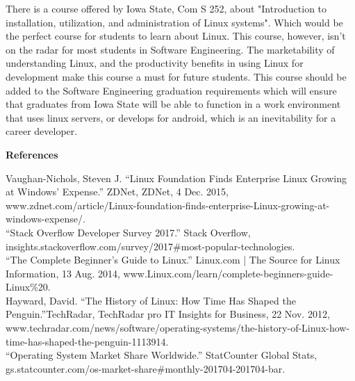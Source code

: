 \documentclass[11pt]{article}
\begin{document}
  \noindent There is a course offered by Iowa State, Com S 252, about "Introduction to installation, utilization, and administration of Linux systems". Which would be the perfect course
  for students to learn about Linux. This course, however, isn't on the radar for most students in Software Engineering. The marketability of understanding Linux, and the productivity benefits in using Linux for development
  make this course a must for future students. This course should be added to the Software Engineering graduation requirements which will ensure that graduates from Iowa State will be able to function
  in a work environment that uses linux servers, or develops for android, which is an inevitability for a career developer.

  \clearpage

  \begin{center} \large{\textbf{References}} \end{center}

  \noindent Vaughan-Nichols, Steven J. “Linux Foundation Finds Enterprise Linux Growing at Windows' Expense.” ZDNet, ZDNet, 4 Dec. 2015,\\ www.zdnet.com/article/Linux-foundation-finds-enterprise-Linux-growing-at-windows-expense/.\\

  \noindent “Stack Overflow Developer Survey 2017.” Stack Overflow,\\ insights.stackoverflow.com/survey/2017\#most-popular-technologies.\\

  \noindent “The Complete Beginner's Guide to Linux.” Linux.com | The Source for Linux Information, 13 Aug. 2014, www.Linux.com/learn/complete-beginners-guide-Linux\%20.\\

  \noindent Hayward, David. “The History of Linux: How Time Has Shaped the Penguin.”TechRadar, TechRadar pro IT Insights for Business, 22 Nov. 2012,\\ www.techradar.com/news/software/operating-systems/the-history-of-Linux-how-time-has-shaped-the-penguin-1113914.\\

  \noindent “Operating System Market Share Worldwide.” StatCounter Global Stats,\\ gs.statcounter.com/os-market-share\#monthly-201704-201704-bar.
\end{document}
